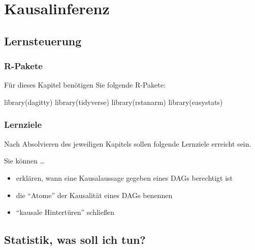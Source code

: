 \documentclass[
  a4paper,
  DIV=11]{scrreprt}
\newenvironment{Shaded}{\begin{snugshade}}{\end{snugshade}}
\newcommand{\FunctionTok}[1]{\textcolor[rgb]{0.28,0.35,0.67}{#1}}
\newcommand{\NormalTok}[1]{\textcolor[rgb]{0.00,0.23,0.31}{#1}}
\providecommand{\tightlist}{%
  \setlength{\itemsep}{0pt}\setlength{\parskip}{0pt}}\usepackage{longtable,booktabs,array}
\theoremstyle{definition}
\theoremstyle{remark}
\begin{document}

\hypertarget{kausalinferenz}{%
\chapter{Kausalinferenz}\label{kausalinferenz}}

\hypertarget{lernsteuerung-9}{%
\section{Lernsteuerung}\label{lernsteuerung-9}}

\hypertarget{r-pakete-1}{%
\subsection{R-Pakete}\label{r-pakete-1}}

Für dieses Kapitel benötigen Sie folgende R-Pakete:

\begin{Shaded}
\begin{Highlighting}[]
\FunctionTok{library}\NormalTok{(dagitty)}
\FunctionTok{library}\NormalTok{(tidyverse)}
\FunctionTok{library}\NormalTok{(rstanarm)}
\FunctionTok{library}\NormalTok{(easystats)}
\end{Highlighting}
\end{Shaded}

\hypertarget{lernziele-10}{%
\subsection{Lernziele}\label{lernziele-10}}

Nach Absolvieren des jeweiligen Kapitels sollen folgende Lernziele
erreicht sein.

Sie können \ldots{}

\begin{itemize}
\tightlist
\item
  erklären, wann eine Kausalaussage gegeben eines DAGs berechtigt ist
\item
  die ``Atome'' der Kausalität eines DAGs benennen
\item
  ``kausale Hintertüren'' schließen
\end{itemize}

\hypertarget{statistik-was-soll-ich-tun}{%
\section{Statistik, was soll ich
tun?}\label{statistik-was-soll-ich-tun}}
\end{document}
